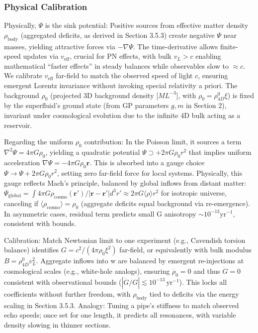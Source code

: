 \documentclass{article}
\begin{document}
\subsubsection{Physical Calibration}

Physically, $\Psi$ is the sink potential: Positive sources from effective matter density $\rho_{\text{body}}$ (aggregated deficits, as derived in Section 3.5.3) create negative $\Psi$ near masses, yielding attractive forces via $-\nabla \Psi$. The time-derivative allows finite-speed updates via $v_{\text{eff}}$, crucial for PN effects, with bulk $v_L > c$ enabling mathematical ``faster effects'' in steady balances while observables slow to $\approx c$. We calibrate $v_{\text{eff}}$ far-field to match the observed speed of light $c$, ensuring emergent Lorentz invariance without invoking special relativity a priori. The background $\rho_0$ (projected 3D background density [$M L^{-3}$], with $\rho_0 = \rho_{4D}^0 \xi$) is fixed by the superfluid's ground state (from GP parameters $g, m$ in Section 2), invariant under cosmological evolution due to the infinite 4D bulk acting as a reservoir.

Regarding the uniform $\rho_0$ contribution: In the Poisson limit, it sources a term $\nabla^2 \Psi = 4\pi G \rho_0$, yielding a quadratic potential $\Psi \supset +2\pi G \rho_0 r^2$ that implies uniform acceleration $\nabla \Psi = -4\pi G \rho_0 \mathbf{r}$. This is absorbed into a gauge choice $\Psi \to \Psi + 2\pi G \rho_0 r^2$, setting zero far-field force for local systems. Physically, this gauge reflects Mach's principle, balanced by global inflows from distant matter: $\Psi_{\text{global}} = \int 4\pi G \rho_{\text{cosmo}}(\mathbf{r}') / |\mathbf{r} - \mathbf{r}'| d^3 r' \approx 2\pi G \langle \rho \rangle r^2$ for isotropic universe, canceling if $\langle \rho_{\text{cosmo}} \rangle = \rho_0$ (aggregate deficits equal background via re-emergence). In asymmetric cases, residual term predicts small G anisotropy $\sim 10^{-13} \mathrm{yr}^{-1}$, consistent with bounds.

Calibration: Match Newtonian limit to one experiment (e.g., Cavendish torsion balance) identifies $G = c^2 / (4\pi \rho_0 \xi^2)$ far-field, or equivalently with bulk modulus $B = \rho_{4D}^0 v_L^2$. Aggregate inflows into w are balanced by emergent re-injections at cosmological scales (e.g., white-hole analogs), ensuring $\dot{\rho_0} = 0$ and thus $\dot{G} = 0$ consistent with observational bounds ($ |\dot{G}/G| \lesssim 10^{-13} \, \mathrm{yr}^{-1} $). This locks all coefficients without further freedom, with $\rho_{\text{body}}$ tied to deficits via the energy scaling in Section 3.5.3. Analogy: Tuning a pipe's stiffness to match observed echo speeds; once set for one length, it predicts all resonances, with variable density slowing in thinner sections.
\end{document}
